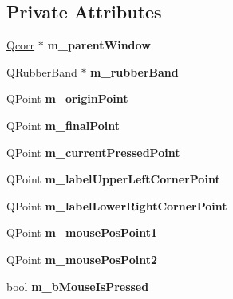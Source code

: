 \subsection*{Private Attributes}
\begin{DoxyCompactItemize}
\item 
\hypertarget{classImgLabel_abf77749e36bca018728bde2fc9a974eb}{
\hyperlink{classQcorr}{Qcorr} $\ast$ {\bfseries m\_\-parentWindow}}
\label{classImgLabel_abf77749e36bca018728bde2fc9a974eb}

\item 
\hypertarget{classImgLabel_aa62e5311b110d0551158c93c6c90e4cf}{
QRubberBand $\ast$ {\bfseries m\_\-rubberBand}}
\label{classImgLabel_aa62e5311b110d0551158c93c6c90e4cf}

\item 
\hypertarget{classImgLabel_afbbcbd660b7ef7c6048286ac5e350343}{
QPoint {\bfseries m\_\-originPoint}}
\label{classImgLabel_afbbcbd660b7ef7c6048286ac5e350343}

\item 
\hypertarget{classImgLabel_a6309ebb41fd14f64eb552e772c3bad25}{
QPoint {\bfseries m\_\-finalPoint}}
\label{classImgLabel_a6309ebb41fd14f64eb552e772c3bad25}

\item 
\hypertarget{classImgLabel_a24136f0f97b3f157721c07091a8261ac}{
QPoint {\bfseries m\_\-currentPressedPoint}}
\label{classImgLabel_a24136f0f97b3f157721c07091a8261ac}

\item 
\hypertarget{classImgLabel_a5818aa44b47111a75d4f1d4b749f6ba1}{
QPoint {\bfseries m\_\-labelUpperLeftCornerPoint}}
\label{classImgLabel_a5818aa44b47111a75d4f1d4b749f6ba1}

\item 
\hypertarget{classImgLabel_ae9c219000c7ccb81a73f9784ba9df23b}{
QPoint {\bfseries m\_\-labelLowerRightCornerPoint}}
\label{classImgLabel_ae9c219000c7ccb81a73f9784ba9df23b}

\item 
\hypertarget{classImgLabel_ad58eb83a86663876080a2e24ad016b39}{
QPoint {\bfseries m\_\-mousePosPoint1}}
\label{classImgLabel_ad58eb83a86663876080a2e24ad016b39}

\item 
\hypertarget{classImgLabel_a5d8c18646dda1aaf5c574ed88b63b0ee}{
QPoint {\bfseries m\_\-mousePosPoint2}}
\label{classImgLabel_a5d8c18646dda1aaf5c574ed88b63b0ee}

\item 
\hypertarget{classImgLabel_ab7550fba92f0346edd4a61c1a84eee4d}{
bool {\bfseries m\_\-bMouseIsPressed}}
\label{classImgLabel_ab7550fba92f0346edd4a61c1a84eee4d}


\end{DoxyCompactItemize}
